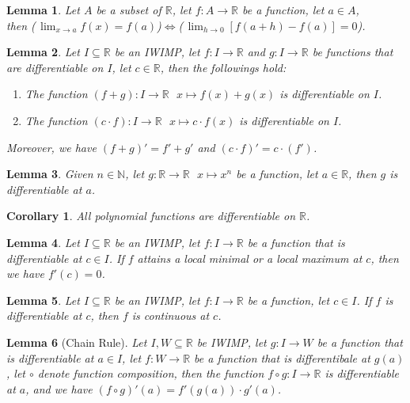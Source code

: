 \documentclass[11pt]{article}
\theoremstyle{break}
\theoremstyle{break}
\newtheorem{lem}{Lemma}[thm]
\newtheorem{corL}{Corollary}[lem]
\newcommand{\R}{\mathbb{R}}
\newcommand{\N}{\mathbb{N}}
\begin{document}
	\begin{lem}
		Let $A$ be a subset of $\R$, let $f:A \to \R$ be a function, let $a \in A$,\\ then (\,$\lim_{x \to a} f(x)=f(a)$)$\iff$(\,$\lim_{h \to 0}[f(a+h)-f(a)]=0$).
	\end{lem}
	
	\begin{lem}
		Let $I \subseteq \R$ be an IWIMP, let $f:I \to \R$ and $g:I \to \R$ be functions that are differentiable on $I$, let $c \in \R$, then the followings hold: 
		\begin{enumerate}[topsep=3pt,itemsep=-1ex,partopsep=1ex,parsep=1ex]
		\item The function $(f+g):I \to \R \ \ \ x \mapsto f(x)+g(x)$ is differentiable on $I$.
		\item The function $(c \cdot f): I \to \R \ \ \ x \mapsto c \cdot f(x)$ is differentiable on $I$.
		\end{enumerate}
		Moreover, we have $(f+g)'=f'+g'$ and $(c \cdot f)' = c \cdot (f')$.
	\end{lem}
	
	\begin{lem}
		Given $n \in \N$, let $g:\R \to \R \ \ \ x \mapsto x^n$ be a function, let $a \in \R$, then $g$ is differentiable at $a$.
	\end{lem}
	
	\begin{corL}
		All polynomial functions are differentiable on $\R$.
	\end{corL}
	
	\begin{lem}
		Let $I \subseteq \R$ be an IWIMP, let $f:I \to \R$ be a function that is differentiable at $c \in I$. If $f$ attains a local minimal or a local maximum at $c$, then we have $f'(c)=0$.
	\end{lem} 

	\begin{lem}
		Let $I \subseteq \R$ be an IWIMP, let $f:I \to \R$ be a function, let $c \in I$. If $f$ is differentiable at $c$, then $f$ is continuous at $c$.
	\end{lem}
	
	\begin{lem}[Chain Rule]
		Let $I,W \subseteq \R$ be IWIMP, let $g:I \to W$ be a function that is differentiable at $a \in I$, let $f:W \to \R$ be a function that is differentibale at $g(a)$, let $\circ$ denote function composition, then the function $f \circ g : I \to \R$ is differentiable at $a$, and we have $(f \circ g)'(a) = f'(g(a)) \cdot g'(a)$.
	\end{lem}
	
\end{document}

